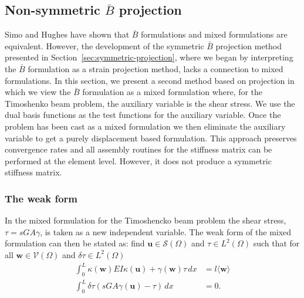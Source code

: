 \subsection{Non-symmetric \Bezier $\bar{B}$ projection}
\label{sec:non-symmetric}

{Simo and Hughes \cite{Hug00} have shown that $\bar{B}$ formulations and mixed formulations are equivalent. However, the development of the symmetric \Bezier $\bar{B}$ projection method presented in Section~\ref{sec:symmetric-projection}, where we began by interpreting the $\bar{B}$ formulation as a strain projection method, lacks a connection to mixed formulations. In this section, we present a second method based on \Bezier projection in which we view the $\bar{B}$ formulation as a mixed formulation where, for the Timoshenko beam problem, the auxiliary variable is the shear stress. We use the \Bezier dual basis functions as the test functions for the auxiliary variable. Once the problem has been cast as a mixed formulation we then eliminate the auxiliary variable to get a purely displacement based formulation. This approach preserves convergence rates and all assembly routines for the stiffness matrix can be performed at the element level. However, it does not produce a symmetric stiffness matrix.}

\subsubsection{The weak form}
{In the mixed formulation for the Timoshencko beam problem the shear stress, $\tau=sGA\gamma$, is taken as a new independent variable. The weak form of the mixed formulation can then be stated as: find $\mathbf{u}\in{\mathcal{S}(\Omega)}$ and $\tau\in{L}^2(\Omega)$ such that for all $\mathbf{w}\in{\mathcal{V}(\Omega)}$ and $\delta\tau\in{L}^2(\Omega)$}
\begin{align}
    \int_{0}^L\kappa(\mathbf{w})EI\kappa(\mathbf{u}) + {\gamma}(\mathbf{w})\tau \, dx & = l\langle{\mathbf{w}}\rangle \\
    \int_{0}^L\delta\tau(sGA\gamma(\mathbf{u})-\tau) \, dx                            & = 0.
\end{align}
